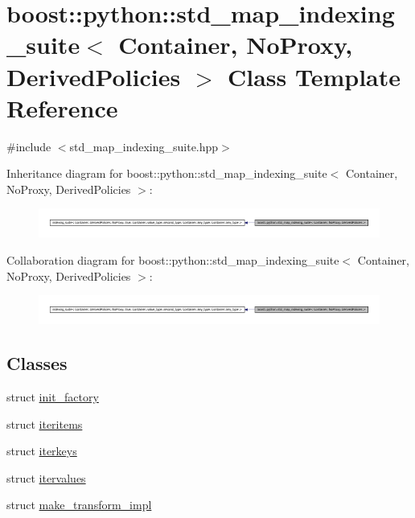 \hypertarget{classboost_1_1python_1_1std__map__indexing__suite}{\section{boost\-:\-:python\-:\-:std\-\_\-map\-\_\-indexing\-\_\-suite$<$ \-Container, \-No\-Proxy, \-Derived\-Policies $>$ \-Class \-Template \-Reference}
\label{classboost_1_1python_1_1std__map__indexing__suite}
}


{\ttfamily \#include $<$std\-\_\-map\-\_\-indexing\-\_\-suite.\-hpp$>$}



\-Inheritance diagram for boost\-:\-:python\-:\-:std\-\_\-map\-\_\-indexing\-\_\-suite$<$ \-Container, \-No\-Proxy, \-Derived\-Policies $>$\-:\nopagebreak
\begin{figure}[H]
\begin{center}
\leavevmode
\includegraphics[width=350pt]{classboost_1_1python_1_1std__map__indexing__suite__inherit__graph}
\end{center}
\end{figure}


\-Collaboration diagram for boost\-:\-:python\-:\-:std\-\_\-map\-\_\-indexing\-\_\-suite$<$ \-Container, \-No\-Proxy, \-Derived\-Policies $>$\-:\nopagebreak
\begin{figure}[H]
\begin{center}
\leavevmode
\includegraphics[width=350pt]{classboost_1_1python_1_1std__map__indexing__suite__coll__graph}
\end{center}
\end{figure}
\subsection*{\-Classes}
\begin{DoxyCompactItemize}
\item 
struct \hyperlink{structboost_1_1python_1_1std__map__indexing__suite_1_1init__factory}{init\-\_\-factory}
\item 
struct \hyperlink{structboost_1_1python_1_1std__map__indexing__suite_1_1iteritems}{iteritems}
\item 
struct \hyperlink{structboost_1_1python_1_1std__map__indexing__suite_1_1iterkeys}{iterkeys}
\item 
struct \hyperlink{structboost_1_1python_1_1std__map__indexing__suite_1_1itervalues}{itervalues}
\item 
struct \hyperlink{structboost_1_1python_1_1std__map__indexing__suite_1_1make__transform__impl}{make\-\_\-transform\-\_\-impl}
\end{DoxyCompactItemize}
